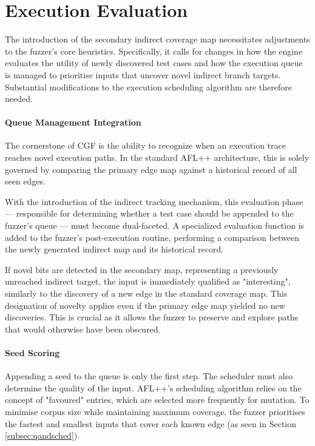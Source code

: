 \section{Execution Evaluation}

The introduction of the secondary indirect coverage map necessitates adjustments to the fuzzer's core heuristics. Specifically, it calls for changes in how the engine evaluates the utility of newly discovered test cases and how the execution queue is managed to prioritise inputs that uncover novel indirect branch targets. Substantial modifications to the execution scheduling algorithm are therefore needed.

\paragraph{Queue Management Integration} The cornerstone of CGF is the ability to recognize when an execution trace reaches novel execution paths. In the standard AFL++ architecture, this is solely governed by comparing the primary edge map against a historical record of all seen edges.

With the introduction of the indirect tracking mechanism, this evaluation phase --- responsible for determining whether a test case should be appended to the fuzzer's queue --- must become dual-faceted. A specialized evaluation function is added to the fuzzer's post-execution routine, performing a comparison between the newly generated indirect map and its historical record.

If novel bits are detected in the secondary map, representing a previously unreached indirect target, the input is immediately qualified as "interesting", similarly to the discovery of a new edge in the standard coverage map. This designation of novelty applies even if the primary edge map yielded no new discoveries. This is crucial as it allows the fuzzer to preserve and explore paths that would otherwise have been obscured.

\paragraph{Seed Scoring} Appending a seed to the queue is only the first step. The scheduler must also determine the quality of the input. AFL++'s scheduling algorithm relies on the concept of "favoured" entries, which are selected more frequently for mutation. To minimise corpus size while maintaining maximum coverage, the fuzzer prioritises the fastest and smallest inputs that cover each known edge (as seen in Section \ref{subsec:qandsched}).

